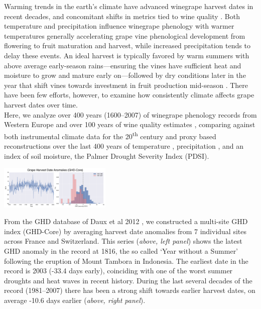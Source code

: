 \documentclass[portrait,a0,final] {a0poster} %
\begin{document}
\begin{multicols}{2}
Warming trends in the earth's climate have advanced winegrape harvest dates in recent decades\cite{Duchene:2005bd,Seguin2005,schultzjones,webb2012}, and concomitant shifts in metrics tied to wine quality \cite{jones2005}. Both temperature and precipitation influence winegrape phenology with warmer temperatures generally accelerating grape vine  phenological development from flowering to fruit maturation and harvest, while increased precipitation tends to delay these events. An ideal harvest is typically favored by warm summers with above average early-season rains---ensuring the vines have sufficient heat and moisture to grow and mature early on---followed by dry conditions later in the year that shift vines towards investment in fruit production mid-season \cite{baciocco2014}. There have been few efforts, however, to examine how consistently climate affects grape harvest dates over time.\\

Here, we analyze over 400 years (1600--2007) of winegrape phenology records from Western Europe \cite{daux2012} and over 100 years of wine quality estimates \cite{Broadbent2002}, comparing against both instrumental climate data for the 20\textsuperscript{th} century \cite{Harris2014} and proxy based reconstructions over the last 400 years of temperature \cite{Luterbacher2004}, precipitation \cite{Pauling2006}, and an index of soil moisture, the Palmer Drought Severity Index \cite{CookOWDA2015} (PDSI).\\

\begin{center}
\includegraphics[width=0.4\textwidth]{../MANUSCRIPT/fig_01_time_ghd_core.png}
\end{center}
From the GHD database of Daux et al 2012 \cite{daux2012}, we constructed a multi-site GHD index (GHD-Core) by averaging harvest date anomalies from 7 individual sites across France and Switzerland. This series (\emph{above, left panel}) shows the latest GHD anomaly in the record at 1816, the so called `Year without a Summer' following the eruption of Mount Tambora in Indonesia. The earliest date in the record is 2003 (-33.4 days early), coinciding with one of the worst summer droughts and heat waves in recent history. During the last several decades of the record (1981--2007) there has been a strong shift towards earlier harvest dates, on average -10.6 days earlier (\emph{above, right panel}). 

\end{multicols}
\end{document}
